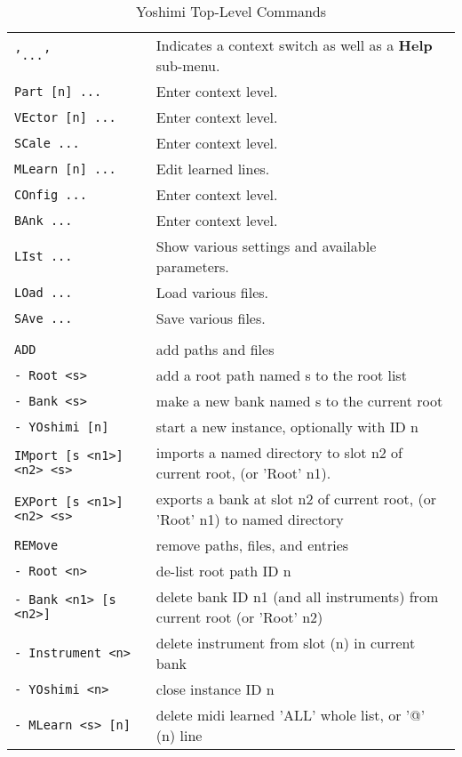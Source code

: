 \begin{center}
\begin{longtable}{p{6cm} p{10cm}}
\caption[Yoshimi Top-Level Commands]{Yoshimi Top-Level Commands} \\
\texttt{'...'} &
   Indicates a context switch as well as a \textbf{Help} sub-menu. \\
\texttt{Part [n] ...} &
   Enter context level. \\
\texttt{VEctor [n] ...} &
   Enter context level. \\
\texttt{SCale ...} &
   Enter context level. \\
\texttt{MLearn [n] ...} &
   Edit learned lines. \\
\texttt{COnfig ...} &
   Enter context level. \\
\texttt{BAnk ...} &
   Enter context level. \\
\texttt{LIst ...} &
   Show various settings and available parameters. \\
\texttt{LOad ...} &
   Load various files. \\
\texttt{SAve ...} &
   Save various files. \\
\texttt{} & \\ %
\texttt{ADD} &
   add paths and files \\
\texttt{- Root <s>} &
   add a root path named s to the root list \\
\texttt{- Bank <s>} &
   make a new bank named s to the current root \\
\texttt{- YOshimi [n]} &
   start a new instance, optionally with ID n \\
\texttt{IMport [s <n1>] <n2> <s>} &
   imports a named directory to slot n2 of current root, (or 'Root' n1). \\
\texttt{EXPort [s <n1>] <n2> <s>} &
   exports a bank at slot n2 of current root, (or 'Root' n1) to named
   directory \\
\texttt{REMove} &
   remove paths, files, and entries \\
\texttt{- Root <n>} &
   de-list root path ID n \\
\texttt{- Bank <n1> [s <n2>]} &
   delete bank ID n1 (and all instruments) from current root
   (or 'Root' n2) \\
\texttt{- Instrument <n>} &
   delete instrument from slot (n) in current bank \\
\texttt{- YOshimi <n>} &
   close instance ID n \\
\texttt{- MLearn <s> [n]} &
   delete midi learned 'ALL' whole list, or '@' (n) line \\


\end{longtable}
\end{center}
